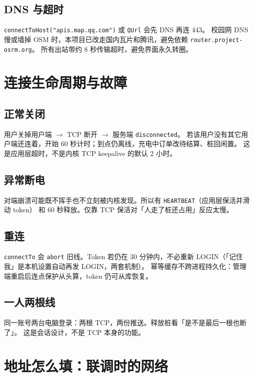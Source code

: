\documentclass[UTF8,a4paper,11pt]{ctexart}
\begin{document}
\subsection{DNS 与超时}

\texttt{connectToHost("apis.map.qq.com")} 或 \texttt{QUrl} 会先 DNS 再连 443。
校园网 DNS 慢或墙掉 OSM 时，本项目已改走国内瓦片和腾讯，避免依赖 \texttt{router.project-osrm.org}。
所有出站带约 8 秒传输超时，避免界面永久转圈。

\section{连接生命周期与故障}

\subsection{正常关闭}

用户关掉用户端 $\to$ TCP 断开 $\to$ 服务端 \texttt{disconnected}。
若该用户没有其它用户端还连着，开始 60 秒计时；到点仍离线，充电中订单改待结算、桩回闲置。
这是应用层超时，不是内核 TCP keepalive 的默认 2 小时。

\subsection{异常断电}

对端崩溃可能既不挥手也不立刻被内核发现。所以有 \texttt{HEARTBEAT}（应用层保活并滑动 token）
和 60 秒释放。仅靠 TCP 保活对「人走了桩还占用」反应太慢。

\subsection{重连}

\texttt{connectTo} 会 \texttt{abort} 旧线。Token 若仍在 30 分钟内，不必重新 LOGIN（「记住我」是本机设置自动再发 LOGIN，两套机制）。
幂等缓存不跨进程持久化：管理端重启后连点保护从头算，token 仍可从库恢复。

\subsection{一人两根线}

同一账号两台电脑登录：两根 TCP，两份推送。释放桩看「是不是最后一根也断了」。
这是会话设计，不是 TCP 本身的功能。

\section{地址怎么填：联调时的网络}
\end{document}
